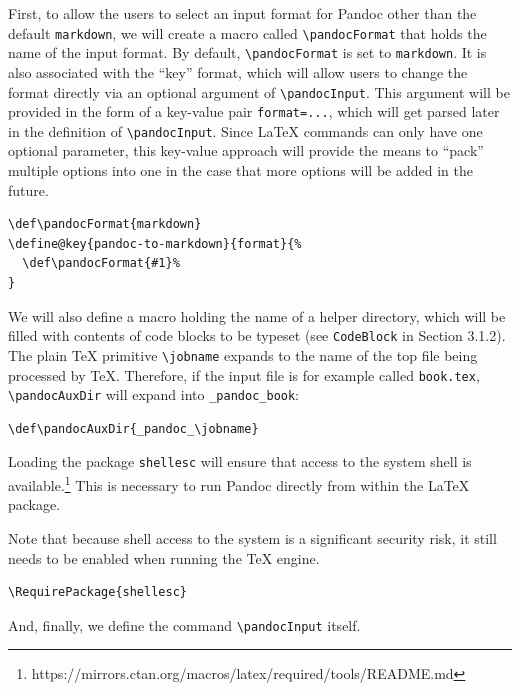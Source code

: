 \documentclass[
  digital,     %
  oneside,     %
  nosansbold,  %
  nocolorbold, %
  lof,         %
  nolot,       %
]{fithesis4}
\newcommand\macro[1]{\texttt{\textbackslash{}{#1}}}
\begin{document}
First, to allow the users to select an input format for Pandoc other than the default \texttt{markdown}, we will create a macro called \macro{pandocFormat} that holds the name of the input format. By default, \macro{pandocFormat} is set to \texttt{markdown}. It is also associated with the ``key'' format, which will allow users to change the format directly via an optional argument of \macro{pandocInput}. This argument will be provided in the form of a key-value pair \texttt{format=...}, which will get parsed later in the definition of \macro{pandocInput}. Since \LaTeX{} commands can only have one optional parameter, this key-value approach will provide the means to ``pack'' multiple options into one in the case that more options will be added in the future.

\noindent
\lstset{language=[LaTeX]TeX}
\begin{lstlisting}
\def\pandocFormat{markdown}
\define@key{pandoc-to-markdown}{format}{%
  \def\pandocFormat{#1}%
}
\end{lstlisting}

\noindent
We will also define a macro holding the name of a helper directory, which will be filled with contents of code blocks to be typeset (see \texttt{CodeBlock} in Section 3.1.2). The plain \TeX{} primitive \macro{jobname} expands to the name of the top file being processed by \TeX{}. Therefore, if the input file is for example called \texttt{book.tex}, \macro{pandocAuxDir} will expand into \texttt{\_pandoc\_book}:

\noindent
\lstset{language=[LaTeX]TeX}
\begin{lstlisting}
\def\pandocAuxDir{_pandoc_\jobname}
\end{lstlisting}

\noindent
Loading the package \texttt{shellesc} will ensure that access to the system shell is available.\footnote{https://mirrors.ctan.org/macros/latex/required/tools/README.md} This is necessary to run Pandoc directly from within the \LaTeX{} package.

Note that because shell access to the system is a significant security risk, it still needs to be enabled when running the \TeX{} engine.

\noindent
\lstset{language=[LaTeX]TeX}
\begin{lstlisting}
\RequirePackage{shellesc}
\end{lstlisting}

\noindent
And, finally, we define the command \macro{pandocInput} itself.
\end{document}
